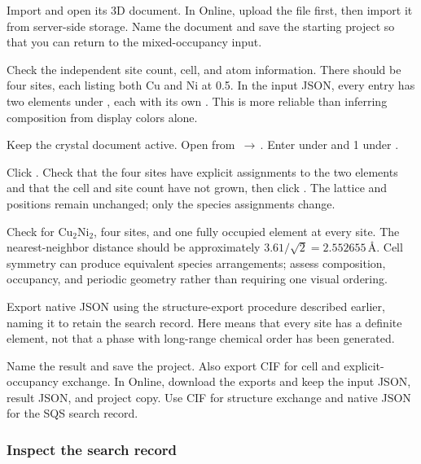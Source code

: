 \begin{steps}
  \item Import  and open its 3D document. In Online, upload the file first, then import it from server-side storage. Name the document  and save the starting project so that you can return to the mixed-occupancy input.
  \item Check the independent site count, cell, and atom information. There should be four sites, each listing both Cu and Ni at 0.5. In the input JSON, every  entry has two elements under , each with its own . This is more reliable than inferring composition from display colors alone.
  \item Keep the crystal document active. Open  from \,$\rightarrow$\,. Enter  under  and 1 under .
  \item Click . Check that the four sites have explicit assignments to the two elements and that the cell and site count have not grown, then click . The lattice and positions remain unchanged; only the species assignments change.
  \item Check for Cu$_2$Ni$_2$, four sites, and one fully occupied element at every site. The nearest-neighbor distance should be approximately $3.61/\sqrt{2}=2.552655\,\text{\AA}$. Cell symmetry can produce equivalent species arrangements; assess composition, occupancy, and periodic geometry rather than requiring one visual ordering.
  \item Export native JSON using the structure-export procedure described earlier, naming it  to retain the search record. Here  means that every site has a definite element, not that a phase with long-range chemical order has been generated.
  \item Name the result  and save the project. Also export CIF for cell and explicit-occupancy exchange. In Online, download the exports and keep the input JSON, result JSON, and project copy. Use CIF for structure exchange and native JSON for the SQS search record.
\end{steps}

\subsubsection*{Inspect the search record}

